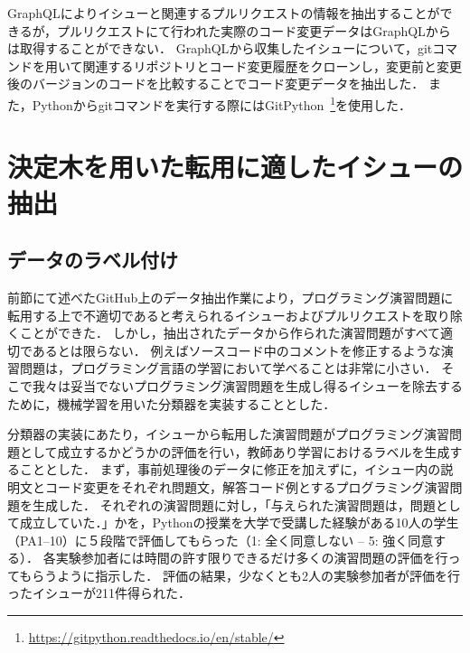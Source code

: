 GraphQLによりイシューと関連するプルリクエストの情報を抽出することができるが，プルリクエストにて行われた実際のコード変更データはGraphQLからは取得することができない．
GraphQLから収集したイシューについて，gitコマンドを用いて関連するリポジトリとコード変更履歴をクローンし，変更前と変更後のバージョンのコードを比較することでコード変更データを抽出した．
また，Pythonからgitコマンドを実行する際にはGitPython~\footnote{\url{https://gitpython.readthedocs.io/en/stable/}}を使用した．

  
\section{決定木を用いた転用に適したイシューの抽出}

\subsection{データのラベル付け}
前節にて述べたGitHub上のデータ抽出作業により，プログラミング演習問題に転用する上で不適切であると考えられるイシューおよびプルリクエストを取り除くことができた．
しかし，抽出されたデータから作られた演習問題がすべて適切であるとは限らない．
例えばソースコード中のコメントを修正するような演習問題は，プログラミング言語の学習において学べることは非常に小さい．
そこで我々は妥当でないプログラミング演習問題を生成し得るイシューを除去するために，機械学習を用いた分類器を実装することとした．


分類器の実装にあたり，イシューから転用した演習問題がプログラミング演習問題として成立するかどうかの評価を行い，教師あり学習におけるラベルを生成することとした．
まず，事前処理後のデータに修正を加えずに，イシュー内の説明文とコード変更をそれぞれ問題文，解答コード例とするプログラミング演習問題を生成した．
それぞれの演習問題に対し，「与えられた演習問題は，問題として成立していた．」かを，Pythonの授業を大学で受講した経験がある10人の学生（PA1--10）に５段階で評価してもらった（1: 全く同意しない -- 5: 強く同意する）．
各実験参加者には時間の許す限りできるだけ多くの演習問題の評価を行ってもらうように指示した．
評価の結果，少なくとも2人の実験参加者が評価を行ったイシューが211件得られた．

